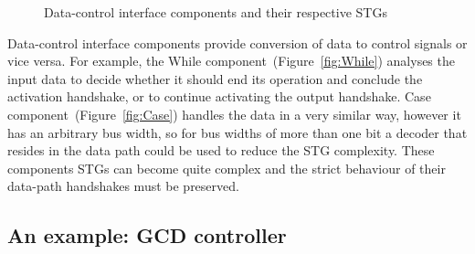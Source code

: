 \begin{figure}
\begin{raggedright}
\par\end{raggedright}

\caption{Data-control interface components and their respective STGs\label{fig:Data-control-interface-components}}
\end{figure}


Data-control interface components provide conversion of data to control
signals or vice versa. For example, the While component~(Figure~\ref{fig:While})
analyses the input data to decide whether it should end its operation
and conclude the activation handshake, or to continue activating the
output handshake. Case component~(Figure~\ref{fig:Case}) handles
the data in a very similar way, however it has an arbitrary bus width,
so for bus widths of more than one bit a decoder that resides in the
data path could be used to reduce the STG complexity. These components
STGs can become quite complex and the strict behaviour of their data-path
handshakes must be preserved.


\subsection{An example: GCD controller}

